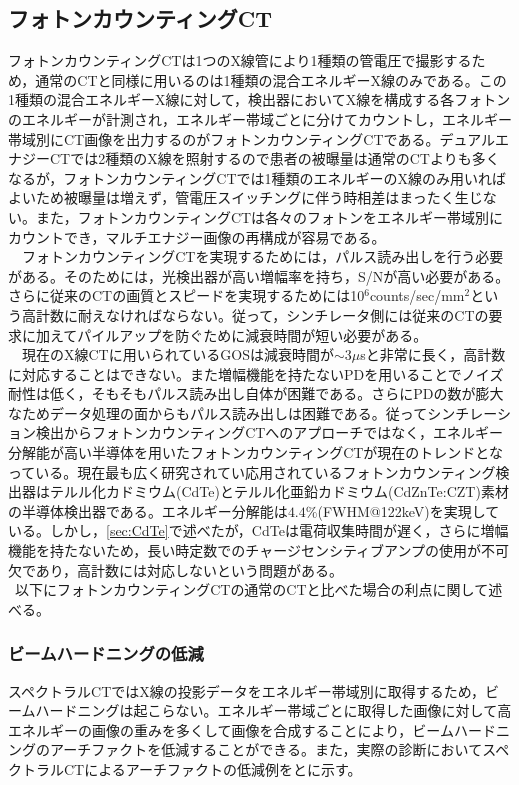 \subsection{フォトンカウンティングCT\label{sec:CT_photon}}
フォトンカウンティングCTは1つのX線管により1種類の管電圧で撮影するため，通常のCTと同様に用いるのは1種類の混合エネルギーX線のみである。この1種類の混合エネルギーX線に対して，検出器においてX線を構成する各フォトンのエネルギーが計測され，エネルギー帯域ごとに分けてカウントし，エネルギー帯域別にCT画像を出力するのがフォトンカウンティングCTである。デュアルエナジーCTでは2種類のX線を照射するので患者の被曝量は通常のCTよりも多くなるが，フォトンカウンティングCTでは1種類のエネルギーのX線のみ用いればよいため被曝量は増えず，管電圧スイッチングに伴う時相差はまったく生じない。また，フォトンカウンティングCTは各々のフォトンをエネルギー帯域別にカウントでき，マルチエナジー画像の再構成が容易である。\\
\ \ フォトンカウンティングCTを実現するためには，パルス読み出しを行う必要がある。そのためには，光検出器が高い増幅率を持ち，S/Nが高い必要がある。さらに従来のCTの画質とスピードを実現するためには10$^6$counts/sec/mm$^2$という高計数に耐えなければならない。従って，シンチレータ側には従来のCTの要求に加えてパイルアップを防ぐために減衰時間が短い必要がある。\\ 
\ \ 現在のX線CTに用いられているGOSは減衰時間が$\sim$3$\mu$sと非常に長く，高計数に対応することはできない。また増幅機能を持たないPDを用いることでノイズ耐性は低く，そもそもパルス読み出し自体が困難である。さらにPDの数が膨大なためデータ処理の面からもパルス読み出しは困難である。従ってシンチレーション検出からフォトンカウンティングCTへのアプローチではなく，エネルギー分解能が高い半導体を用いたフォトンカウンティングCTが現在のトレンドとなっている。現在最も広く研究されてい応用されているフォトンカウンティング検出器はテルル化カドミウム(CdTe)とテルル化亜鉛カドミウム(CdZnTe:CZT)素材の半導体検出器である\cite{ogawa}\cite{ogawa_id}\cite{kowase}\cite{Adam}\cite{Jan}。エネルギー分解能は$4.4\%$(FWHM@122keV)を実現している\cite{ogawa}。しかし，\ref{sec:CdTe}で述べたが，CdTeは電荷収集時間が遅く，さらに増幅機能を持たないため，長い時定数でのチャージセンシティブアンプの使用が不可欠であり，高計数には対応しないという問題がある。\\\ 以下にフォトンカウンティングCTの通常のCTと比べた場合の利点に関して述べる。

\subsubsection{ビームハードニングの低減}
スペクトラルCTではX線の投影データをエネルギー帯域別に取得するため，ビームハードニングは起こらない。エネルギー帯域ごとに取得した画像に対して高エネルギーの画像の重みを多くして画像を合成することにより，ビームハードニングのアーチファクトを低減することができる\cite{kowase}。また，実際の診断においてスペクトラルCTによるアーチファクトの低減例\cite{spectralCT}をとに示す。

